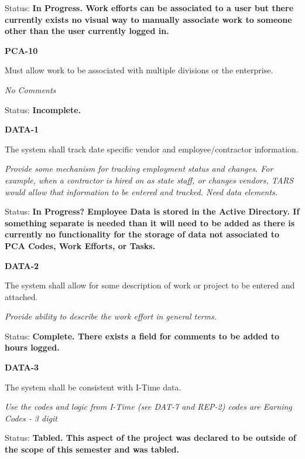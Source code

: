 \documentclass{article}
\begin{document}
\noindent Status: \textbf{In Progress.   Work efforts can be associated to a user but there currently exists no visual way to manually associate work to someone other than the user currently logged in.}

\noindent \textit{}


\noindent \textbf{PCA-10}

\noindent Must allow work to be associated with multiple divisions or the enterprise.

\textit{No Comments}

 Status: \textbf{Incomplete.}

\noindent \textit{}


\noindent \textbf{DATA-1}

\noindent The system shall track date specific vendor and employee/contractor information.

\noindent \textit{Provide some mechanism for tracking employment status and changes. For example, when a contractor is hired on as state staff, or changes vendors, TARS would allow that information to be entered and tracked. Need data elements.}

\noindent Status: \textbf{In Progress?  Employee Data is stored in the Active Directory.  If something separate is needed than it will need to be added as there is currently no functionality for the storage of data not associated to PCA Codes, Work Efforts, or Tasks.}

\noindent \textit{}


\noindent \textbf{DATA-2}

\noindent The system shall allow for some description of work or project to be entered and attached.

\textit{Provide ability to describe the work effort in general terms.}

Status: \textbf{Complete.  There exists a field for comments to be added to hours logged.}\textit{}

\noindent \textit{}


\noindent \textbf{DATA-3}

\noindent The system shall be consistent with I-Time data.

\textit{Use the codes and logic from I-Time (see DAT-7 and REP-2) codes are Earning Codes - 3 digit}

\noindent Status: \textbf{Tabled.  This aspect of the project was declared to be outside of the scope of this semester and was tabled.}\textit{}

\noindent \textit{}
\end{document}
